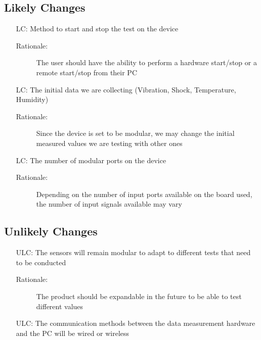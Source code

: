 \documentclass[12pt,titlepage]{article}
\newcounter{lcnum} %
\newcounter{ulcnum}
\begin{document}
\subsection{Likely Changes}    

\noindent \begin{itemize}
\item[LC\refstepcounter{lcnum}\thelcnum:] Method to start and stop the test on the device
\begin{description} \item[Rationale:] The user should have the ability to perform a hardware start/stop or a remote start/stop from their PC \end{description}

\item[LC\refstepcounter{lcnum}\thelcnum:] The initial data we are collecting (Vibration, Shock, Temperature, Humidity)
\begin{description} \item[Rationale:] Since the device is set to be modular, we may change the initial measured values we are testing with other ones \end{description}

\item[LC\refstepcounter{lcnum}\thelcnum:] The number of modular ports on the device
\begin{description} \item[Rationale:] Depending on the number of input ports available on the board used, the number of input signals available may vary \end{description}


\end{itemize}

\subsection{Unlikely Changes}    

\noindent \begin{itemize}

\item[ULC\refstepcounter{ulcnum}\theulcnum:] The sensors will remain modular to adapt to different tests that need to be conducted
\begin{description} \item[Rationale:] The product should be expandable in the future to be able to test different values \end{description}

\item[ULC\refstepcounter{ulcnum}\theulcnum:] The communication methods between the data measurement hardware and the PC will be wired or wireless


\end{itemize}
\end{document}

